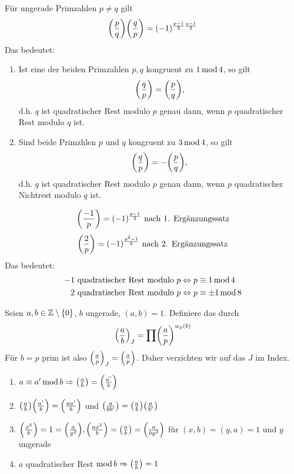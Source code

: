 \begin{satz} \label{satz_6.1}
	Für ungerade Primzahlen $p \neq q$ gilt
	\begin{equation}
		\leg{p}{q} \leg{q}{p} = (-1)^{\frac{p-1}{2} \frac{q-1}{2}} \label{eq_quadrez}
	\end{equation}
	Das bedeutet:  \begin{enumerate}[1)]
		\item Ist eine der beiden Primzahlen $p,q$ kongruent zu $1 \operatorname{mod} 4$, so gilt
			\[ \leg{q}{p} = \leg{p}{q}, \]
			d.h. $q$ ist quadratischer Rest modulo $p$ genau dann, wenn $p$ quadratischer Rest modulo $q$ ist.
		\item Sind beide Primzhlen $p$ und $q$ kongruent zu $3 \operatorname{mod} 4$, so gilt
			\[ \leg{q}{p} = -\leg{p}{q}, \]
			d.h. $q$ ist quadratischer Rest modulo $p$ genau dann, wenn $p$ quadratischer Nichtrest modulo $q$ ist.
	\end{enumerate}
\end{satz}

	\[ \left(\frac{-1}{p}\right) = (-1)^\frac{p-1}{2} \text{ nach 1. Ergänzungssatz} \]
	\[ \left(\frac{2}{p}\right) = (-1)^\frac{p^2-1}{8} \text{ nach 2. Ergänzungssatz} \]
	Das bedeutet:
	\begin{equation}
	\begin{aligned}
		-1 \text{ quadratischer Rest modulo } p &\Leftrightarrow p \equiv 1 \operatorname{mod} 4 \\
		2 \text{ quadratischer Rest modulo } p &\Leftrightarrow p \equiv \pm 1 \operatorname{mod} 8 
	\end{aligned}
	\end{equation}
	
\begin{defn}
	Seien $a, b \in \mathbb{Z} \setminus \{0\}$, $b$ ungerade, $(a,b) = 1$. Definiere das  durch 
	\begin{equation}
		\leg{a}{b}_J = \prod \leg{a}{p}^{w_p(b)}
	\end{equation}
	Für $b = p$ prim ist also $\left(\frac{a}{p}\right)_J = \left(\frac{a}{p}\right)$. Daher verzichten wir auf das $J$ im Index.
\end{defn}

	\begin{enumerate}[(1)]
		\item $a \equiv a' \operatorname{mod} b \Rightarrow \left(\frac{a}{b}\right) = \left(\frac{a'}{b}\right)$
		\item $\leg{a}{b} \leg{a'}{b} = \leg{aa'}{b}$ und $\leg{a}{bb'} = \leg{a}{b} \leg{a}{b'}$
		\item $\leg{x^2}{b} = 1 = \leg{a}{y^2}, \leg{ax^2}{b} = \leg{a}{b} = \leg{a}{by^2}$ für $(x,b) = (y,a) = 1$ und $y$ ungerade
		\item $a$ quadratischer Rest $\operatorname{mod} b \Rightarrow \left(\frac{a}{b}\right) = 1$
	\end{enumerate}
	
